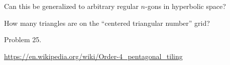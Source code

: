 \documentclass{article}
\begin{document}
\begin{related}
  \item Can this be generalized to arbitrary regular $n$-gons in hyperbolic
    space?
  \item How many triangles are on the ``centered triangular number'' grid?

\end{related}
\begin{references}
  \item Problem 25.
  \item \url{https://en.wikipedia.org/wiki/Order-4_pentagonal_tiling}
\end{references}
\end{document}
